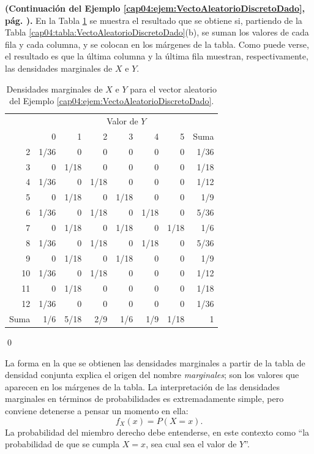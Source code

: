 \begin{ejemplo}
\label{cap04:ejem:densidadesMarginales}
{\bf (Continuación del Ejemplo \ref{cap04:ejem:VectoAleatorioDiscretoDado}, pág. \pageref{cap04:ejem:VectoAleatorioDiscretoDado}).} En la Tabla \ref{cap04:tabla:MarginalesVectoAleatorioDiscretoDado} se muestra el resultado que se obtiene si, partiendo de la Tabla \ref{cap04:tabla:VectoAleatorioDiscretoDado}(b), se suman los valores de cada fila y cada columna, y se colocan en los márgenes de la tabla. Como puede verse, el resultado es que la última columna y la última fila muestran, respectivamente, las densidades marginales de $X$ e $Y$.
\begin{table}[ht]
\begin{center}
{
}
\quad
\begin{tabular}{|r|r|r|r|r|r|r|r|}
  \multicolumn{1}{c}{}&\multicolumn{7}{c}{Valor de $Y$}\\
  \cline{2-8}
  \multicolumn{1}{c|}{}& 0 & 1 & 2 & 3 & 4 & 5 & Suma \\
  \hline
  2 & 1/36 & 0 & 0 & 0 & 0 & 0 & 1/36 \\ \hline
  3 & 0 & 1/18 & 0 & 0 & 0 & 0 & 1/18 \\ \hline
  4 & 1/36 & 0 & 1/18 & 0 & 0 & 0 & 1/12 \\ \hline
  5 & 0 & 1/18 & 0 & 1/18 & 0 & 0 & 1/9 \\ \hline
  6 & 1/36 & 0 & 1/18 & 0 & 1/18 & 0 & 5/36 \\ \hline
  7 & 0 & 1/18 & 0 & 1/18 & 0 & 1/18 & 1/6 \\ \hline
  8 & 1/36 & 0 & 1/18 & 0 & 1/18 & 0 & 5/36 \\ \hline
  9 & 0 & 1/18 & 0 & 1/18 & 0 & 0 & 1/9 \\ \hline
  10 & 1/36 & 0 & 1/18 & 0 & 0 & 0 & 1/12 \\ \hline
  11 & 0 & 1/18 & 0 & 0 & 0 & 0 & 1/18 \\ \hline
  12 & 1/36 & 0 & 0 & 0 & 0 & 0 & 1/36 \\ \hline
  Suma & 1/6 & 5/18 & 2/9 & 1/6 & 1/9 & 1/18 & 1 \\
   \hline
\end{tabular}
\end{center}
\caption{Densidades marginales de $X$ e $Y$ para el vector aleatorio del Ejemplo \ref{cap04:ejem:VectoAleatorioDiscretoDado}.}
\label{cap04:tabla:MarginalesVectoAleatorioDiscretoDado}
\end{table}
\qed
\end{ejemplo}
La forma en la que se obtienen las densidades marginales a partir de la tabla de densidad conjunta explica el origen del nombre {\em marginales}; son los valores que aparecen en los márgenes de la tabla. La interpretación de las densidades marginales en términos de probabilidades es extremadamente simple, pero conviene detenerse a pensar un momento en ella:
\begin{equation}
\label{cap04:ecu:DensidadMarginalXInterpretacionProababilistica}
f_X(x)=P(X=x).
\end{equation}
La probabilidad del miembro derecho debe entenderse, en este contexto como ``la probabilidad de que se cumpla $X=x$, sea cual sea el valor de $Y$''.

